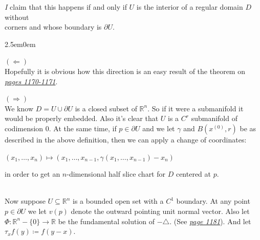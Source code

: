 \documentclass{book}
\newcommand{\inLinkRap}[2]{{\color{blue}\hyperlink{#1}{\textit{#2}}}}
\newcommand{\hTwo}{%
\color{Black}%
   \fontsize{13}{15}\selectfont%
}
\newcommand{\pracTwo}{
   \color{Orange}%
   \fontsize{12}{14}\selectfont%
}
\newenvironment{myIndent}{%
   \begin{adjustwidth}{2.5em}{0em}%
}{%
   \end{adjustwidth}%
}
\newcommand{\mySepTwo}[1][.]{%
   {\noindent\color{#1}{\rule{6.5in}{0.5mm}}}\\%
}
\newcommand{\retTwo}{\hfill\bigbreak}
\begin{document}
\textit{I} claim that this happens if and only if $U$ is the interior of a regular domain $D$ without\\ corners and whose boundary is $\partial U$.
\begin{myIndent}\pracTwo
	$(\Longleftarrow)$\\
	Hopefully it is obvious how this direction is an easy result of the theorem on\\ \inLinkRap{Theorem page 1170}{pages 1170-1171}.\retTwo

	$(\Longrightarrow)$\\
	We know $D = U \cup \partial U$ is a closed subset of $\mathbb{R}^n$. So if it were a submanifold it would be properly embedded. Also it's clear that $U$ is a $C^r$ submanifold of codimension $0$. At the same time, if $p \in \partial U$ and we let $\gamma$ and $B(x^{(0)}, r)$ be as described in the above definition, then we can apply a change of coordinates:

	{\centering $(x_1, \ldots, x_n) \mapsto (x_1, \ldots, x_{n-1}, \gamma(x_1, \ldots, x_{n-1}) - x_n)$ \retTwo\par}

	in order to get an $n$-dimensional half slice chart for $D$ centered at $p$.\retTwo
\end{myIndent}
\mySepTwo

\hTwo Now suppose $U \subseteq \mathbb{R}^n$ is a bounded open set with a $C^1$ boundary. At any point $p \in \partial U$ we let $v(p)$ denote the outward pointing unit normal vector. Also let $\Phi: \mathbb{R}^n - \{0\} \to \mathbb{R}$ be the fundamental solution of $-\triangle$. (See \inLinkRap{Fundamental Solution of $-\triangle$}{page 1181}). And let $\tau_x f(y) \coloneqq f(y - x)$.\newpage
\end{document}

